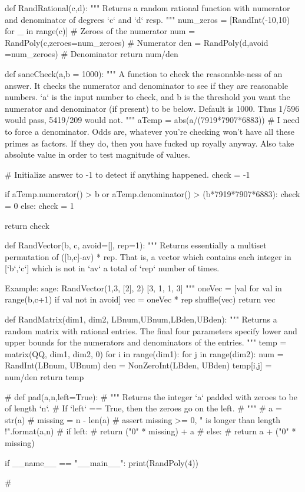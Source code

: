 \begin{sagesilent}
def RandRational(c,d):
    """ Returns a random rational function with numerator and denominator of degrees `c` and `d` resp.
    """
    num_zeros = [RandInt(-10,10) for _ in range(c)] # Zeroes of the numerator
    num = RandPoly(c,zeroes=num_zeroes) # Numerator
    den = RandPoly(d,avoid =num_zeroes) # Denominator
    return num/den

def saneCheck(a,b = 1000):
    """ A function to check the reasonable-ness of an answer. It checks the 
        numerator and denominator to see if they are reasonable numbers. `a` is 
        the input number to check, and b is the threshold you want the numerator
        and denominator (if present) to be below. Default is 1000. Thus 1/596
        would pass, 5419/209 would not.
    """
    aTemp = abs(a/(7919*7907*6883)) # I need to force a denominator. Odds are, whatever you're checking won't have all these primes as factors. If they do, then you have fucked up royally anyway. Also take absolute value in order to test magnitude of values.
    
    # Initialize answer to -1 to detect if anything happened.
    check = -1
    
    if aTemp.numerator() > b or aTemp.denominator() > (b*7919*7907*6883):
        check = 0
    else:
        check = 1
    
    return check

def RandVector(b, c, avoid=[], rep=1):
    """ Returns essentially a multiset permutation of ([b,c]-av) * rep.
        That is, a vector which contains each integer in [`b`,`c`] which is not in `av` a total of `rep` number of times.

        Example:
        sage: RandVector(1,3, [2], 2)
        [3, 1, 1, 3]
    """
    oneVec = [val for val in range(b,c+1) if val not in avoid]
    vec = oneVec * rep
    shuffle(vec)
    return vec

def RandMatrix(dim1, dim2, LBnum,UBnum,LBden,UBden):
    """ Returns a random matrix with rational entries. 
        The final four parameters specify lower and upper bounds for the 
        numerators and denominators of the entries.
    """
    temp = matrix(QQ, dim1, dim2, 0)
    for i in range(dim1):
        for j in range(dim2):
            num = RandInt(LBnum, UBnum)
            den = NonZeroInt(LBden, UBden)
            temp[i,j] = num/den
    return temp

# def pad(a,n,left=True):
#   """ Returns the integer `a` padded with zeroes to be of length `n`.
#       If `left` == True, then the zeroes go on the left.
#   """
#   a = str(a)
#   missing = n - len(a) 
#   assert missing >= 0, "{} is longer than length {}!".format(a,n)
#   if left:
#       return ("0" * missing) + a
#   else:
#       return a + ("0" * missing)

if __name__ == "__main__":
    print(RandPoly(4))

# \end{sagesilent}